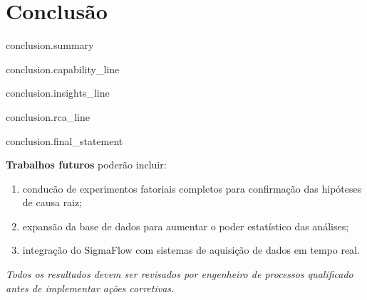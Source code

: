 \section{Conclus\~{a}o}

{{ conclusion.summary }}

{{ conclusion.capability_line }}

{{ conclusion.insights_line }}

{{ conclusion.rca_line }}

{{ conclusion.final_statement }}

\vspace{0.5cm}
\noindent\textbf{Trabalhos futuros} poder\~{a}o incluir:
\begin{enumerate}[label=(\roman*)]
\item conduc\~{a}o de experimentos fatoriais completos para confirma\c{c}\~{a}o das hip\'oteses de causa raiz;
\item expans\~{a}o da base de dados para aumentar o poder estat\'istico das an\'alises;
\item integra\c{c}\~{a}o do SigmaFlow com sistemas de aquisi\c{c}\~{a}o de dados em tempo real.
\end{enumerate}

\vspace{0.4cm}
\begin{center}
\textit{Todos os resultados devem ser revisados por engenheiro de processos qualificado antes de implementar a\c{c}\~{o}es corretivas.}
\end{center}
